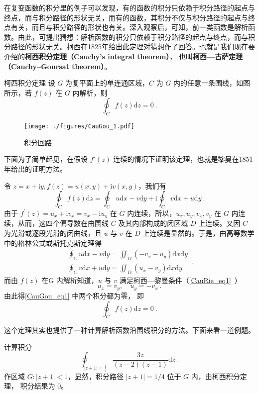 


在复变函数的积分里的例子可以发现，有的函数的积分只依赖于积分路径的起点与终点，而与积分路径的形状无关，而有的函数，其积分不仅与积分路径的起点与终点有关，而且与积分路径的形状也有关。深入观察后，可知，前一类函数是解析函数。由此，可提出猜想：解析函数的积分只依赖于积分路径的起点与终点，而与积分路径的形状无关。柯西在1825年给出此定理对猜想作了回答。也就是我们现在要介绍的\textbf{柯西积分定理（Cauchy's integral theorem）}， 也叫\textbf{柯西—古萨定理（Cauchy–Goursat theorem）}。

\begin{theorem}{柯西积分定理}
设 $G $ 为复平面上的单连通区域，$C $ 为 $G $ 内的任意一条围线，如图所示，若 $f (z)$ 在 $G $ 内解析，则
\begin{equation}
\oint_{C} f(z) \mathrm{d} z=0~.
\end{equation}
\begin{figure}[ht]
\centering
\texttt{[image: ./figures/CauGou\_1.pdf]}
\caption{积分回路} \label{CauGou_fig1}
\end{figure}

下面为了简单起见，在假设 $f'(z)$ 连续的情况下证明该定理，也就是黎曼在1851年给出的证明方法。

令 $z=x+\mathrm{i} y, f(z)=u(x, y)+\mathrm{i} v(x, y)$，我们有
\begin{equation}
\oint_{C} f(z) \mathrm{d} z=\oint_{C} u \mathrm{d} x-v \mathrm{d} y+\mathrm{i} \oint_{C} v \mathrm{d} x+u \mathrm{d} y~.
\end{equation}
由于 $f^{\prime}(z)=u_{x}+\mathrm{i} v_{x}=v_{x}-\mathrm{i} u_{y}$ 在 $G $ 内连续，所以，$u_{x}, u_{y}, v_{x}, v_{y}$ 在 $G $ 内连续，从而，这四个偏导数在由围线 $C$ 及其内部构成的闭区域 $D $ 上连续。又因 $C $ 为光滑或逐段光滑的闭曲线，且 $u $ 与 $v $ 在 $D $ 上连续是显然的。于是，由高等数学中的格林公式或斯托克斯定理得
\begin{equation}\label{CauGou_eq1}
\begin{aligned}\oint_C u \mathrm{d} x-v \mathrm{d} y=\iint_{D}\left(-v_{x}-u_{y}\right) \mathrm{d} x \mathrm{d} y \\ \oint_C v \mathrm{d} x+u \mathrm{d} y=\iint_{D}\left(u_{x}-v_{y}\right) \mathrm{d} x \mathrm{d} y\end{aligned}~.
\end{equation}
而由 $ f (z)$ 在G 内解析知道，$u$ 与 $v$ 满足柯西—黎曼条件（\autoref{CauRie_eq1}~）
\begin{equation}
u_{x}=v_{y}, \quad u_{y}=-v_{x}~.
\end{equation}
由此得\autoref{CauGou_eq1} 中两个积分都为零， 即
\begin{equation}
\oint_{C} f(z) \mathrm{d} z=0~.
\end{equation}
\end{theorem}
这个定理其实也提供了一种计算解析函数沿围线积分的方法。下面来看一道例题。
\begin{example}{}
计算积分
\begin{equation}
\oint_{|z+1|=\frac{1}{4}} \frac{3 z}{(z-2)(z-1)} \mathrm{d} z~.
\end{equation}
作区域 $G:|z+1|<1$，显然，积分路径 $|z+1|=1/4$ 位于 $G$ 内，由柯西积分定理， 积分结果为 0。
\end{example}
